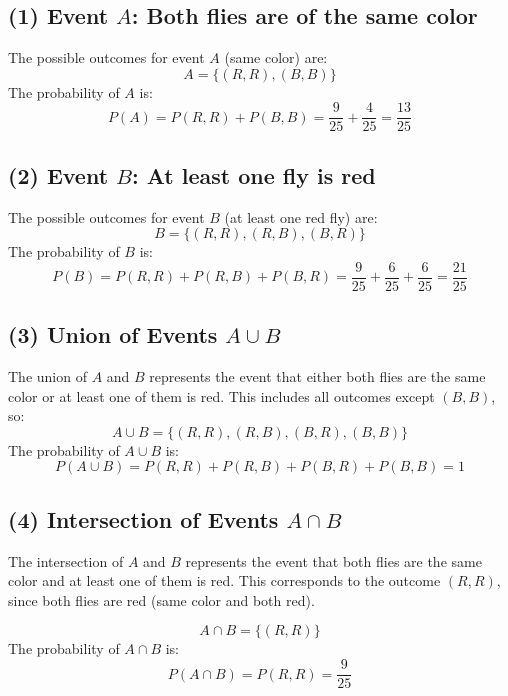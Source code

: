 \documentclass{article}
\begin{document}
\subsection*{(1) Event \( A \): Both flies are of the same color}

The possible outcomes for event \( A \) (same color) are:
\[
A = \{ (R,R), (B,B) \}
\]
The probability of \( A \) is:
\[
P(A) = P(R,R) + P(B,B) = \frac{9}{25} + \frac{4}{25} = \frac{13}{25}
\]

\subsection*{(2) Event \( B \): At least one fly is red}

The possible outcomes for event \( B \) (at least one red fly) are:
\[
B = \{ (R,R), (R,B), (B,R) \}
\]
The probability of \( B \) is:
\[
P(B) = P(R,R) + P(R,B) + P(B,R) = \frac{9}{25} + \frac{6}{25} + \frac{6}{25} = \frac{21}{25}
\]

\subsection*{(3) Union of Events \( A \cup B \)}

The union of \( A \) and \( B \) represents the event that either both flies are the same color or at least one of them is red. This includes all outcomes except \( (B,B) \), so:
\[
A \cup B = \{ (R,R), (R,B), (B,R), (B,B) \}
\]
The probability of \( A \cup B \) is:
\[
P(A \cup B) = P(R,R) + P(R,B) + P(B,R) + P(B,B) = 1
\]

\subsection*{(4) Intersection of Events \( A \cap B \)}

The intersection of \( A \) and \( B \) represents the event that both flies are the same color and at least one of them is red. This corresponds to the outcome \( (R,R) \), since both flies are red (same color and both red).

\[
A \cap B = \{ (R,R) \}
\]
The probability of \( A \cap B \) is:
\[
P(A \cap B) = P(R,R) = \frac{9}{25}
\]
\end{document}
